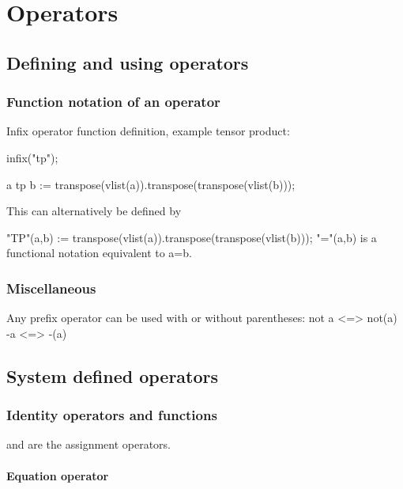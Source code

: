 \documentclass[../Maxima_Workbook.tex]{subfiles}
\begin{document}
	
\chapter{Operators}

\section{Defining and using operators}

\subsection{Function notation of an operator}

Infix operator function definition, example tensor product:

infix("tp");

a tp b := transpose(vlist(a)).transpose(transpose(vlist(b)));

This can alternatively be defined by

"TP"(a,b) := transpose(vlist(a)).transpose(transpose(vlist(b)));
"="(a,b) is a functional notation equivalent to a=b.

\subsection{Miscellaneous}

Any prefix operator can be used with or without parentheses:
not a <=> not(a)
-a <=> -(a)

\section{System defined operators}

\subsection{Identity operators and functions}

\begin{remark}
	\hyl{:}{\emph{:}} and \hyl{::}{\emph{::}} are the assignment operators.
\end{remark}

\subsubsection{Equation operator}

\lz \hyt{=}{\tcr{\emph{=}}} \hfill {}\index{=}
\end{document}
